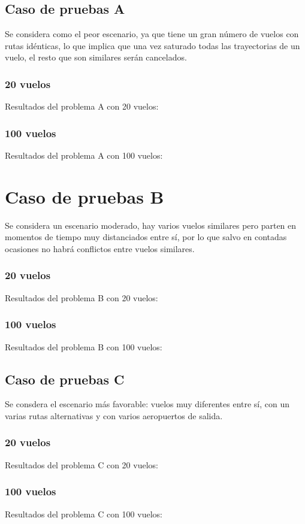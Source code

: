 \subsection{Caso de pruebas A}
Se considera como el peor escenario, ya que tiene un gran número de vuelos con rutas idénticas, lo que implica que una vez saturado todas las trayectorias de un vuelo, el resto que son similares serán cancelados.
\subsubsection{20 vuelos}
Resultados del problema A con 20 vuelos:


\subsubsection{100 vuelos}
Resultados del problema A con 100 vuelos:



\section{Caso de pruebas B}
Se considera un escenario moderado, hay varios vuelos similares pero parten en momentos de tiempo muy distanciados entre sí, por lo que salvo en contadas ocasiones no habrá conflictos entre vuelos similares.
\subsubsection{20 vuelos}
Resultados del problema B con 20 vuelos:


\subsubsection{100 vuelos}
Resultados del problema B con 100 vuelos:



\subsection{Caso de pruebas C}
Se consdera el escenario más favorable: vuelos muy diferentes entre sí, con un varias rutas alternativas y con varios aeropuertos de salida.
\subsubsection{20 vuelos}
Resultados del problema C con 20 vuelos:

\subsubsection{100 vuelos}

Resultados del problema C con 100 vuelos:



